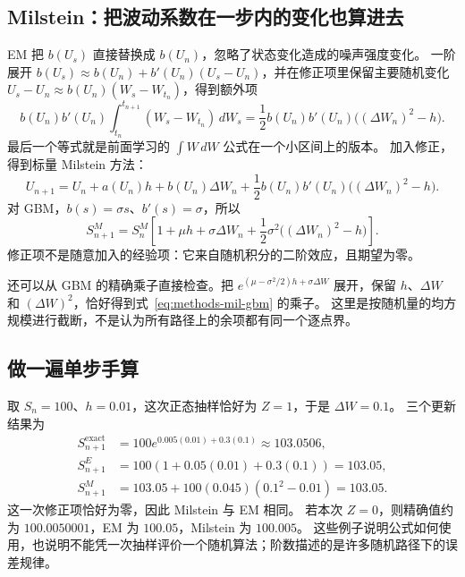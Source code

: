 \documentclass[11pt,a4paper,fontset=none]{ctexart}
\numberwithin{equation}{section}
\begin{document}
\subsection{Milstein：把波动系数在一步内的变化也算进去}
EM 把 $b(U_s)$ 直接替换成 $b(U_n)$，忽略了状态变化造成的噪声强度变化。
一阶展开 $b(U_s)\approx b(U_n)+b'(U_n)(U_s-U_n)$，并在修正项里保留主要随机变化
$U_s-U_n\approx b(U_n)(W_s-W_{t_n})$，得到额外项
\begin{equation}\label{eq:methods-mil-integral}
 b(U_n)b'(U_n)\int_{t_n}^{t_{n+1}}(W_s-W_{t_n})\,dW_s
 =\frac12 b(U_n)b'(U_n)\bigl((\Delta W_n)^2-h\bigr).
\end{equation}
最后一个等式就是前面学习的 $\int W\,dW$ 公式在一个小区间上的版本。
加入修正，得到标量 Milstein 方法：
\begin{equation}\label{eq:methods-mil-general}
 U_{n+1}=U_n+a(U_n)h+b(U_n)\Delta W_n
 +\frac12b(U_n)b'(U_n)\bigl((\Delta W_n)^2-h\bigr).
\end{equation}
对 GBM，$b(s)=\sigma s$、$b'(s)=\sigma$，所以
\begin{equation}\label{eq:methods-mil-gbm}
 S_{n+1}^{M}=S_n^{M}\left[1+\mu h+\sigma\Delta W_n+
 \frac12\sigma^2\bigl((\Delta W_n)^2-h\bigr)\right].
\end{equation}
修正项不是随意加入的经验项：它来自随机积分的二阶效应，且期望为零。

还可以从 GBM 的精确乘子直接检查。把 $e^{(\mu-\sigma^2/2)h+\sigma\Delta W}$ 展开，保留 $h$、$\Delta W$ 和 $(\Delta W)^2$，恰好得到式~\eqref{eq:methods-mil-gbm} 的乘子。
这里是按随机量的均方规模进行截断，不是认为所有路径上的余项都有同一个逐点界。

\subsection{做一遍单步手算}
取 $S_n=100$、$h=0.01$，这次正态抽样恰好为 $Z=1$，于是 $\Delta W=0.1$。
三个更新结果为
\begin{align}
 S_{n+1}^{\mathrm{exact}}&=100e^{0.005(0.01)+0.3(0.1)}
 \approx103.0506,\label{eq:methods-example-exact}\\
 S_{n+1}^{E}&=100(1+0.05(0.01)+0.3(0.1))=103.05,\label{eq:methods-example-em}\\
 S_{n+1}^{M}&=103.05+100(0.045)(0.1^2-0.01)=103.05.\label{eq:methods-example-mil}
\end{align}
这一次修正项恰好为零，因此 Milstein 与 EM 相同。
若本次 $Z=0$，则精确值约为 $100.0050001$，EM 为 $100.05$，Milstein 为 $100.005$。
这些例子说明公式如何使用，也说明不能凭一次抽样评价一个随机算法；阶数描述的是许多随机路径下的误差规律。
\end{document}
